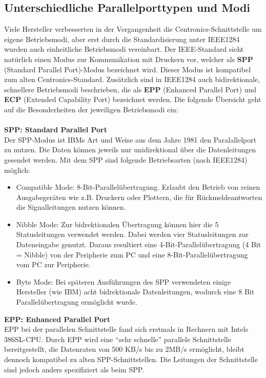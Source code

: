 \documentclass[a4paper,11pt]{article}
\begin{document}
\subsection{Unterschiedliche Parallelporttypen und Modi}

Viele Hersteller verbesserten in der Vergangenheit die Centronics-Schnittstelle um eigene Betriebsmodi, aber erst durch die Standardisierung unter IEEE1284 wurden auch einheitliche Betriebsmodi vereinbart. Der IEEE-Standard sieht natürlich einen Modus zur Kommunikation mit Druckern vor, welcher als \textbf{SPP} (Standard Parallel Port)-Modus bezeichnet wird. Dieser Modus ist kompatibel zum alten Centronics-Standard. Zusätzlich sind in IEEE1284 auch bidirektionale, schnellere Betriebsmodi beschrieben, die als \textbf{EPP} (Enhanced Parallel Port) und \textbf{ECP} (Extended Capability Port) bezeichnet werden. Die folgende Übersicht geht auf die Besonderheiten der jeweiligen Betriebsmodi ein: \\\\

\noindent
\textbf{SPP: Standard Parallel Port}
\\
Der SPP-Modus ist IBMs Art und Weise aus dem Jahre 1981 den Paralallelport zu nutzen. Die Daten können jeweils nur unidirektional über die Datenleitungen gesendet werden. Mit dem SPP sind folgende Betriebsarten (nach IEEE1284) möglich:
\begin{itemize}
\item Compatible Mode:
      8-Bit-Parallelübertragung. Erlaubt den Betrieb von reinen Ausgabegeräten wie z.B. Druckern oder Plottern, die für Rückmeldeantworten die Signalleitungen nutzen können. 
\item Nibble Mode:
      Zur bidrektionalen Übertragung können hier die 5 Statusleitungen verwendet werden. Dabei werden vier Statusleitungen zur Dateneingabe genutzt. Daraus resultiert eine 4-Bit-Parallelübertragung (4 Bit = Nibble) von der Peripherie zum PC und eine 8-Bit-Parallelübertragung vom PC zur Peripherie.
\item Byte Mode:
      Bei späteren Ausführungen des SPP verwendeten einige Hersteller (wie IBM) acht bidrektionale Datenleitungen, wodurch eine 8 Bit Parallelübertragung ermöglicht wurde.\end{itemize}
\noindent
\textbf{EPP: Enhanced Parallel Port}
\\
EPP bei der parallelen Schnittstelle fand sich erstmals in Rechnern mit Intels 386SL-CPU. Durch EPP wird eine ``sehr schnelle'' parallele Schnittstelle bereitgestellt, die Datenraten von 500 KB/s bis zu 2MB/s ermöglicht, bleibt dennoch kompatibel zu alten SPP-Schnittstellen.
Die Leitungen der Schnittstelle sind jedoch anders spezifiziert als beim SPP.
\end{document}
